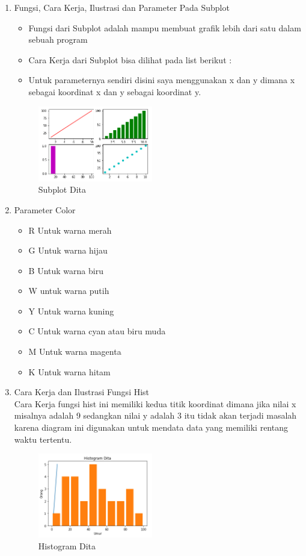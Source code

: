 \begin{enumerate}
\item Fungsi, Cara Kerja, Ilustrasi dan Parameter Pada Subplot\\
\begin{itemize}
\item Fungsi dari Subplot adalah mampu membuat grafik lebih dari satu dalam sebuah program
\item Cara Kerja dari Subplot bisa dilihat pada list berikut :\\

\item Untuk parameternya sendiri disini saya menggunakan x dan y dimana x sebagai koordinat x dan y sebagai koordinat y.
\end{itemize}
\begin{figure}[H]	
    \includegraphics[width=5cm]{figures/6/1174054/Teori/subplot.png}
    \centering
    \caption{Subplot Dita}
\end{figure}

\item Parameter Color
\begin{itemize}
\item R Untuk warna merah
\item G Untuk warna hijau
\item B Untuk warna biru
\item W untuk warna putih
\item Y Untuk warna kuning
\item C Untuk warna cyan atau biru muda
\item M Untuk warna magenta
\item K Untuk warna hitam
\end{itemize}

\item Cara Kerja dan Ilustrasi Fungsi Hist\\
Cara Kerja fungsi hist ini memiliki kedua titik koordinat dimana jika nilai x misalnya adalah 9 sedangkan nilai y adalah 3 itu tidak akan terjadi masalah karena diagram ini digunakan untuk mendata data yang memiliki rentang waktu tertentu.
\begin{figure}[H]	
    \includegraphics[width=5cm]{figures/6/1174054/Teori/histogram.png}
    \centering
    \caption{Histogram Dita}
\end{figure}


\end{enumerate}
